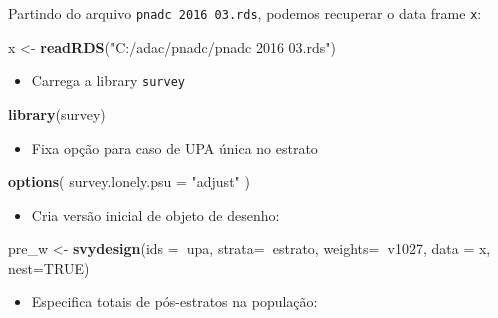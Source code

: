 \documentclass[]{book}
\newenvironment{Shaded}{\begin{snugshade}}{\end{snugshade}}
\newcommand{\KeywordTok}[1]{\textcolor[rgb]{0.13,0.29,0.53}{\textbf{#1}}}
\newcommand{\DataTypeTok}[1]{\textcolor[rgb]{0.13,0.29,0.53}{#1}}
\newcommand{\StringTok}[1]{\textcolor[rgb]{0.31,0.60,0.02}{#1}}
\newcommand{\OtherTok}[1]{\textcolor[rgb]{0.56,0.35,0.01}{#1}}
\newcommand{\OperatorTok}[1]{\textcolor[rgb]{0.81,0.36,0.00}{\textbf{#1}}}
\newcommand{\NormalTok}[1]{#1}
\providecommand{\tightlist}{%
  \setlength{\itemsep}{0pt}\setlength{\parskip}{0pt}}
\theoremstyle{definition}
\theoremstyle{definition}
\theoremstyle{definition}
\theoremstyle{remark}
\begin{document}
Partindo do arquivo \texttt{pnadc\ 2016\ 03.rds}, podemos recuperar o
data frame \texttt{x}:

\begin{Shaded}
\begin{Highlighting}[]
\NormalTok{x <-}\StringTok{ }\KeywordTok{readRDS}\NormalTok{(}\StringTok{"C:/adac/pnadc/pnadc 2016 03.rds"}\NormalTok{)}
\end{Highlighting}
\end{Shaded}

\begin{itemize}
\tightlist
\item
  Carrega a library \texttt{survey}
\end{itemize}

\begin{Shaded}
\begin{Highlighting}[]
\KeywordTok{library}\NormalTok{(survey)}
\end{Highlighting}
\end{Shaded}

\begin{itemize}
\tightlist
\item
  Fixa opção para caso de UPA única no estrato
\end{itemize}

\begin{Shaded}
\begin{Highlighting}[]
\KeywordTok{options}\NormalTok{( }\DataTypeTok{survey.lonely.psu =} \StringTok{"adjust"}\NormalTok{ )}
\end{Highlighting}
\end{Shaded}

\begin{itemize}
\tightlist
\item
  Cria versão inicial de objeto de desenho:
\end{itemize}

\begin{Shaded}
\begin{Highlighting}[]
\NormalTok{pre_w <-}\StringTok{ }\KeywordTok{svydesign}\NormalTok{(}\DataTypeTok{ids =}\OperatorTok{~}\NormalTok{upa, }\DataTypeTok{strata=}\OperatorTok{~}\NormalTok{estrato, }
  \DataTypeTok{weights=}\OperatorTok{~}\NormalTok{v1027, }\DataTypeTok{data =}\NormalTok{ x, }\DataTypeTok{nest=}\OtherTok{TRUE}\NormalTok{)}
\end{Highlighting}
\end{Shaded}

\begin{itemize}
\tightlist
\item
  Especifica totais de pós-estratos na população:
\end{itemize}
\end{document}
